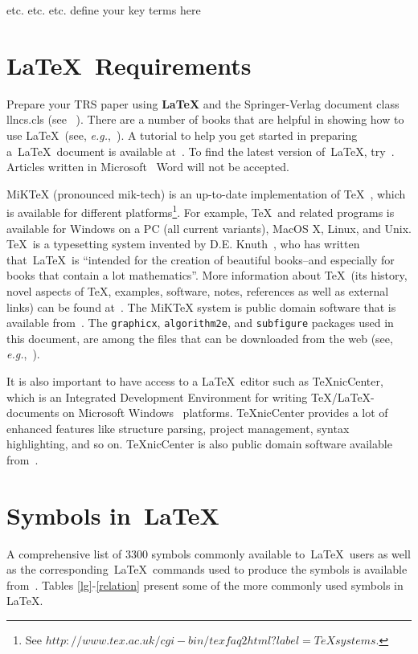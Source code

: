 \documentclass{llncs}
\begin{document}
etc.
etc.
etc.
define your key terms here

\section{\LaTeX~Requirements}\label{req}
Prepare your TRS paper using {\bf \LaTeX} and the Springer-Verlag document class llncs.cls (see ~\cite{springer}).  There are a number of books that are helpful in showing how to use \LaTeX~(see, {\em e.g.},~\cite{math,graphics,companion}).  A tutorial to help you get started in preparing a~\LaTeX~document is available at~\cite{tutorial}.  To find the latest version of~\LaTeX, try~\cite{latest}. Articles written in Microsoft \textregistered~Word will not be accepted.

MiKTeX (pronounced mik-tech) is an up-to-date implementation of \TeX~\cite{texmanual}, which is available for different platforms\footnote{See $http://www.tex.ac.uk/cgi-bin/texfaq2html?label=TeXsystems$.}.  For example, \TeX\ and related programs is available for Windows on a PC (all current variants), MacOS X, Linux, and Unix. \TeX\ is a typesetting system invented by D.E. Knuth~\cite{knuth05}, who has written that~\LaTeX~is ``intended for the creation of beautiful books--and especially for books that contain a lot mathematics''.  More information about \TeX\ (its history, novel aspects of \TeX, examples, software, notes, references as well as external links) can be found at~\cite{tex}. The MiKTeX system is public domain software that is available from~\cite{miktex}.  The \verb|graphicx|, \verb|algorithm2e|, and \verb|subfigure| packages used in this document, are among the files that can be downloaded from the web (see, {\em e.g.},~\cite{alg2e,graph,subfig}).

It is also important to have access to a \LaTeX~editor such as TeXnicCenter, which is an Integrated Development Environment for writing TeX/LaTeX-documents on Microsoft Windows \textregistered~platforms\cite{texnic}.    TeXnicCenter provides a lot of enhanced features like structure parsing, project management, syntax highlighting, and so on.  TeXnicCenter is also public domain software available from~\cite{texcenter}.

\section*{Symbols in~\LaTeX}
\label{symb}

A comprehensive list of 3300 symbols commonly available to~\LaTeX~users as well as the corresponding~\LaTeX~commands used to produce the symbols is available from~\cite{symbols}.  Tables \ref{lg}-\ref{relation} present some of the more commonly used symbols in \LaTeX.
\end{document}
